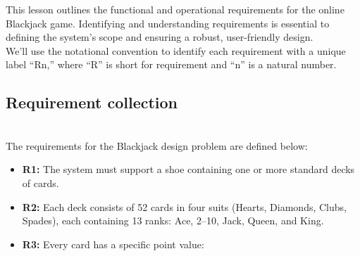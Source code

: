 

This lesson outlines the functional and operational requirements for the online Blackjack game. Identifying and understanding requirements is essential to defining the system's scope and ensuring a robust, user-friendly design.
\\
We'll use the notational convention to identify each requirement with a unique label ``Rn,'' where ``R'' is short for requirement and ``n'' is a natural number.

\subsection{Requirement collection}\label{CMgHu2Xd2kn27aWqIMEwk}
\\
The requirements for the Blackjack design problem are defined below:

\begin{itemize}
\item
\protect{}\label{fKwgomGvBPEdgQJUnj3kg}
\textbf{R1:} The system must support a shoe containing one or more standard decks of cards.
\item
\protect{}\label{rrJpbC7ZZTAJrC7opkR4D}
\textbf{R2:} Each deck consists of 52 cards in four suits (Hearts, Diamonds, Clubs, Spades), each containing 13 ranks: Ace, 2--10, Jack, Queen, and King.
\item
\protect{}\label{CGWu92LqtM_FG7AC4dUXC}
\textbf{R3:} Every card has a specific point value:
\end{itemize}

